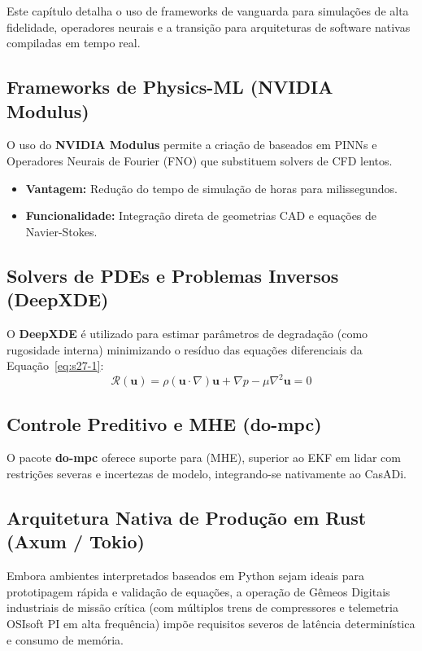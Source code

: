 \documentclass[12pt,a4paper]{article}
\numberwithin{equation}{section}
\numberwithin{table}{section}
\numberwithin{figure}{section}
\begin{document}
{	Este capítulo detalha o uso de frameworks de vanguarda para simulações de alta fidelidade, operadores neurais e a transição para arquiteturas de software nativas compiladas em tempo real.
	
	\subsection{Frameworks de Physics-ML (NVIDIA Modulus)}
	O uso do \textbf{NVIDIA Modulus} \cite{modulus} permite a criação de  baseados em PINNs e Operadores Neurais de Fourier (FNO) que substituem solvers de CFD lentos.
	\begin{itemize}
		\item \textbf{Vantagem:} Redução do tempo de simulação de horas para milissegundos.
		\item \textbf{Funcionalidade:} Integração direta de geometrias CAD e equações de Navier-Stokes.
	\end{itemize}
	
	\subsection{Solvers de PDEs e Problemas Inversos (DeepXDE)}
	O \textbf{DeepXDE} \cite{deepxde} é utilizado para estimar parâmetros de degradação (como rugosidade interna) minimizando o resíduo das equações diferenciais da Equação~\eqref{eq:s27-1}:
	\begin{equation}\label{eq:s27-1}
 \mathcal{R}(\mathbf{u}) = \rho (\mathbf{u} \cdotp \nabla) \mathbf{u} + \nabla p - \mu \nabla^2 \mathbf{u} = 0 
\end{equation}
	
	\subsection{Controle Preditivo e MHE (do-mpc)}
	O pacote \textbf{do-mpc} \cite{dompc} oferece suporte para  (MHE), superior ao EKF em lidar com restrições severas e incertezas de modelo, integrando-se nativamente ao CasADi.
	
	\subsection{Arquitetura Nativa de Produção em Rust (Axum / Tokio)}
	Embora ambientes interpretados baseados em Python sejam ideais para prototipagem rápida e validação de equações, a operação de Gêmeos Digitais industriais de missão crítica (com múltiplos trens de compressores e telemetria OSIsoft PI em alta frequência) impõe requisitos severos de latência determinística e consumo de memória.
	
}
\end{document}
